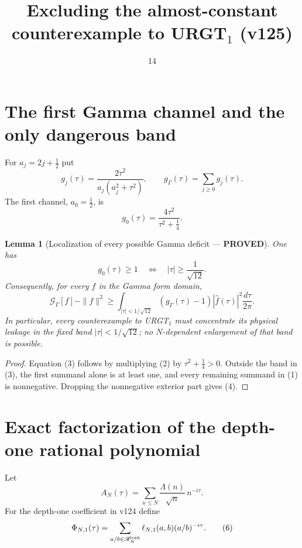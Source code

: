 \documentclass[11pt]{article}
\title{Excluding the almost-constant counterexample to URGT$_1$ (v125)}
\date{14}
\newcommand{\PROVED}{\textcolor{green!40!black}{\textbf{PROVED}}}
\newtheorem{lemma}{Lemma}
\begin{document}
\maketitle

\section{The first Gamma channel and the only dangerous band}

For $a_j=2j+\frac12$ put
\begin{equation}
 g_j(\tau)=\frac{2\tau^2}{a_j(a_j^2+\tau^2)},
 \qquad g_\Gamma(\tau)=\sum_{j\ge0}g_j(\tau).              \tag{1}
\end{equation}
The first channel, $a_0=\frac12$, is
\begin{equation}
 g_0(\tau)=\frac{4\tau^2}{\tau^2+\frac14}.                \tag{2}
\end{equation}

\begin{lemma}[Localization of every possible Gamma deficit --- \PROVED]
One has
\begin{equation}
 g_0(\tau)\ge1
 \quad\Longleftrightarrow\quad
 |\tau|\ge\frac1{\sqrt{12}}.                              \tag{3}
\end{equation}
Consequently, for every $f$ in the Gamma form domain,
\begin{equation}
 \mathcal G_\Gamma[f]-\|f\|^2
 \ge
 \int_{|\tau|<1/\sqrt{12}}
       (g_\Gamma(\tau)-1)|\widehat f(\tau)|^2
       \frac{d\tau}{2\pi}.                               \tag{4}
\end{equation}
In particular, every counterexample to URGT$_1$ must concentrate its
physical leakage in the fixed band
$|\tau|<1/\sqrt{12}$; no $N$-dependent enlargement of that band is
possible.
\end{lemma}

\begin{proof}
Equation (3) follows by multiplying (2) by
$\tau^2+\frac14>0$.  Outside the band in (3), the first summand alone is
at least one, and every remaining summand in (1) is nonnegative.  Dropping
the nonnegative exterior part gives (4).
\end{proof}

\section{Exact factorization of the depth-one rational polynomial}

Let
\begin{equation}
 A_N(\tau)=\sum_{n\le N}\frac{\Lambda(n)}{\sqrt n}\,n^{-i\tau}.
                                                                    \tag{5}
\end{equation}
For the depth-one coefficient in v124 define
\begin{equation}
 \Phi_{N,1}(\tau)=
 \sum_{a/b\in\mathscr R_N^{\rm leak}}
 \ell_{N,1}(a,b)(a/b)^{-i\tau}.                            \tag{6}
\end{equation}
\end{document}
